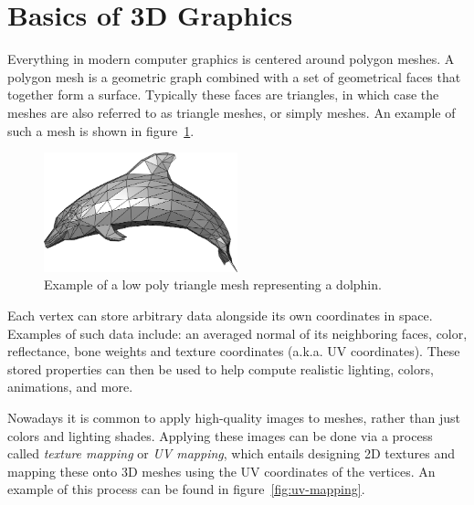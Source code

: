 \section{Basics of 3D Graphics}

Everything in modern computer graphics is centered around polygon meshes.
A polygon mesh is a geometric graph combined with a set of geometrical faces that together form a surface.
Typically these faces are triangles, in which case the meshes are also referred to as triangle meshes, or simply meshes.
An example of such a mesh is shown in figure~\ref{fig:low_poly_dolphin}.

\begin{figure}[h!]
  \centering

  \includegraphics[width=0.5\textwidth]{figure/low_poly_dolphin.png}
  \caption{Example of a low poly triangle mesh representing a dolphin. \cite{low_poly_dolphin}}

  \label{fig:low_poly_dolphin}
\end{figure}

Each vertex can store arbitrary data alongside its own coordinates in space.
Examples of such data include: an averaged normal of its neighboring faces, color, reflectance, bone weights and texture coordinates (a.k.a. UV coordinates).
These stored properties can then be used to help compute realistic lighting, colors, animations, and more.

Nowadays it is common to apply high-quality images to meshes, rather than just colors and lighting shades.
Applying these images can be done via a process called \textit{texture mapping} or \textit{UV mapping}, which entails designing 2D textures and mapping these onto 3D meshes using the UV coordinates of the vertices.
An example of this process can be found in figure~\ref{fig:uv-mapping}.

